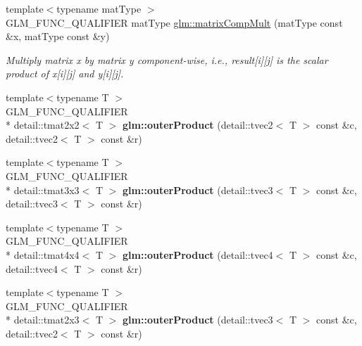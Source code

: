 \begin{DoxyCompactItemize}
\item 
{\footnotesize template$<$typename mat\-Type $>$ }\\G\-L\-M\-\_\-\-F\-U\-N\-C\-\_\-\-Q\-U\-A\-L\-I\-F\-I\-E\-R mat\-Type \hyperlink{group__core__func__matrix_ga0e48491a51b3f366d671c01894705605}{glm\-::matrix\-Comp\-Mult} (mat\-Type const \&x, mat\-Type const \&y)
\begin{DoxyCompactList}\small\item\em Multiply matrix x by matrix y component-\/wise, i.\-e., result\mbox{[}i\mbox{]}\mbox{[}j\mbox{]} is the scalar product of x\mbox{[}i\mbox{]}\mbox{[}j\mbox{]} and y\mbox{[}i\mbox{]}\mbox{[}j\mbox{]}. \end{DoxyCompactList}\item 
\hypertarget{namespaceglm_a0cf59cce1b3f603f94cf33a61bceff19}{{\footnotesize template$<$typename T $>$ }\\G\-L\-M\-\_\-\-F\-U\-N\-C\-\_\-\-Q\-U\-A\-L\-I\-F\-I\-E\-R \\*
detail\-::tmat2x2$<$ T $>$ {\bfseries glm\-::outer\-Product} (detail\-::tvec2$<$ T $>$ const \&c, detail\-::tvec2$<$ T $>$ const \&r)}\label{namespaceglm_a0cf59cce1b3f603f94cf33a61bceff19}

\item 
\hypertarget{namespaceglm_a0be7bdc804f3e5019ed50488ad96deed}{{\footnotesize template$<$typename T $>$ }\\G\-L\-M\-\_\-\-F\-U\-N\-C\-\_\-\-Q\-U\-A\-L\-I\-F\-I\-E\-R \\*
detail\-::tmat3x3$<$ T $>$ {\bfseries glm\-::outer\-Product} (detail\-::tvec3$<$ T $>$ const \&c, detail\-::tvec3$<$ T $>$ const \&r)}\label{namespaceglm_a0be7bdc804f3e5019ed50488ad96deed}

\item 
\hypertarget{namespaceglm_a466c39ec56cd677039b0e768c2fbfbfe}{{\footnotesize template$<$typename T $>$ }\\G\-L\-M\-\_\-\-F\-U\-N\-C\-\_\-\-Q\-U\-A\-L\-I\-F\-I\-E\-R \\*
detail\-::tmat4x4$<$ T $>$ {\bfseries glm\-::outer\-Product} (detail\-::tvec4$<$ T $>$ const \&c, detail\-::tvec4$<$ T $>$ const \&r)}\label{namespaceglm_a466c39ec56cd677039b0e768c2fbfbfe}

\item 
\hypertarget{namespaceglm_a83b1b298cf0e1a51db5eeade5aaf08b1}{{\footnotesize template$<$typename T $>$ }\\G\-L\-M\-\_\-\-F\-U\-N\-C\-\_\-\-Q\-U\-A\-L\-I\-F\-I\-E\-R \\*
detail\-::tmat2x3$<$ T $>$ {\bfseries glm\-::outer\-Product} (detail\-::tvec3$<$ T $>$ const \&c, detail\-::tvec2$<$ T $>$ const \&r)}\label{namespaceglm_a83b1b298cf0e1a51db5eeade5aaf08b1}


\end{DoxyCompactItemize}
